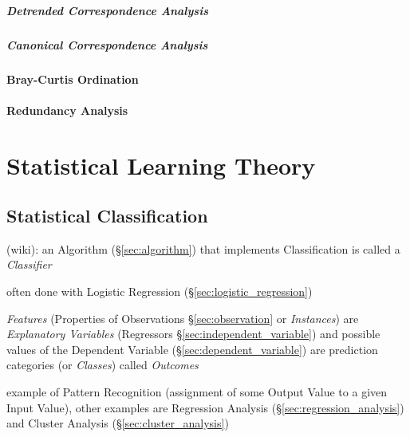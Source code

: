 \subparagraph{Detrended Correspondence Analysis}
\label{sec:detrended_correspondence}\hfill

\subparagraph{Canonical Correspondence Analysis}
\label{sec:canonical_correspondence}\hfill



\paragraph{Bray-Curtis Ordination}\label{sec:bray_curtis_ordination}\hfill

\paragraph{Redundancy Analysis}\label{sec:redundancy_analysis}\hfill



\section{Statistical Learning Theory}\label{sec:statistical_learning_theory}




\subsection{Statistical Classification}\label{sec:statistical_classification}

(wiki): an Algorithm (\S\ref{sec:algorithm}) that implements Classification is
called a \emph{Classifier}

often done with Logistic Regression (\S\ref{sec:logistic_regression})

\emph{Features} (Properties of Observations \S\ref{sec:observation} or
\emph{Instances}) are \emph{Explanatory Variables} (Regressors
\S\ref{sec:independent_variable}) and possible values of the Dependent Variable
(\S\ref{sec:dependent_variable}) are prediction categories (or \emph{Classes})
called \emph{Outcomes}

example of Pattern Recognition (assignment of some Output Value to a given Input
Value), other examples are Regression Analysis (\S\ref{sec:regression_analysis})
and Cluster Analysis (\S\ref{sec:cluster_analysis})



